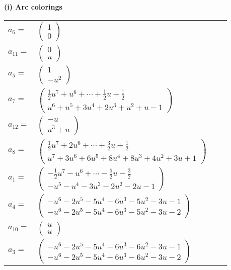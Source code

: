 \documentclass[1p]{elsarticle_modified}
\theoremstyle{definition}
\begin{document}
\flushleft \textbf{(i) Arc colorings}\\
\begin{tabular}{m{7pt} m{180pt} m{7pt} m{180pt} }
\flushright $a_{6}=$&$\begin{pmatrix}1\\0\end{pmatrix}$ \\
\flushright $a_{11}=$&$\begin{pmatrix}0\\u\end{pmatrix}$ \\
\flushright $a_{5}=$&$\begin{pmatrix}1\\- u^2\end{pmatrix}$ \\
\flushright $a_{7}=$&$\begin{pmatrix}\frac{1}{2} u^7+u^6+\cdots+\frac{1}{2} u+\frac{1}{2}\\u^6+u^5+3 u^4+2 u^3+u^2+u-1\end{pmatrix}$ \\
\flushright $a_{12}=$&$\begin{pmatrix}- u\\u^3+u\end{pmatrix}$ \\
\flushright $a_{8}=$&$\begin{pmatrix}\frac{1}{2} u^7+2 u^6+\cdots+\frac{3}{2} u+\frac{1}{2}\\u^7+3 u^6+6 u^5+8 u^4+8 u^3+4 u^2+3 u+1\end{pmatrix}$ \\
\flushright $a_{1}=$&$\begin{pmatrix}-\frac{1}{2} u^7- u^6+\cdots-\frac{5}{2} u-\frac{3}{2}\\- u^5- u^4-3 u^3-2 u^2-2 u-1\end{pmatrix}$ \\
\flushright $a_{4}=$&$\begin{pmatrix}- u^6-2 u^5-5 u^4-6 u^3-5 u^2-3 u-1\\- u^6-2 u^5-5 u^4-6 u^3-5 u^2-3 u-2\end{pmatrix}$ \\
\flushright $a_{10}=$&$\begin{pmatrix}u\\u\end{pmatrix}$ \\
\flushright $a_{3}=$&$\begin{pmatrix}- u^6-2 u^5-5 u^4-6 u^3-6 u^2-3 u-1\\- u^6-2 u^5-5 u^4-6 u^3-6 u^2-3 u-2\end{pmatrix}$ \\

\end{tabular}
\end{document}

